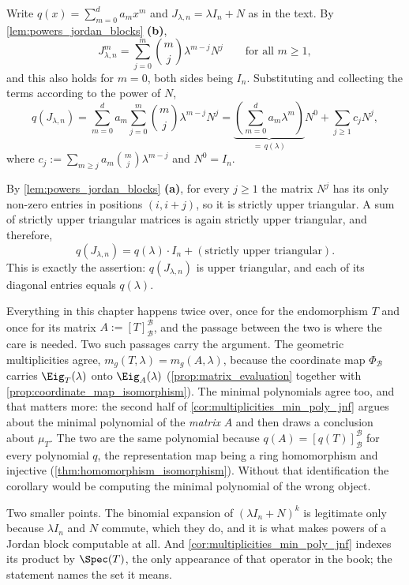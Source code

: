 \begin{exercisesolution}
\label{sol:polynomial_of_jordan_block}
Write $q(x) = \sum_{m=0}^d a_m x^m$ and $J_{\lambda, n} = \lambda I_n + N$ as in the text. By \cref{lem:powers_jordan_blocks} \textbf{(b)},
\[ J_{\lambda,n}^m = \sum_{j=0}^m \binom{m}{j} \lambda^{m-j} N^j \qquad \text{for all } m \ge 1, \]
and this also holds for $m = 0$, both sides being $I_n$. Substituting and collecting the terms according to the power of $N$,
\[
    q(J_{\lambda,n}) = \sum_{m=0}^d a_m \sum_{j=0}^m \binom{m}{j} \lambda^{m-j} N^j = \underbrace{\left(\sum_{m=0}^d a_m \lambda^m\right)}_{= \, q(\lambda)} N^0 + \sum_{j \ge 1} c_j N^j,
\]
where $c_j := \sum_{m \ge j} a_m \binom{m}{j} \lambda^{m-j}$ and $N^0 = I_n$.

By \cref{lem:powers_jordan_blocks} \textbf{(a)}, for every $j \ge 1$ the matrix $N^j$ has its only non-zero entries in positions $(i, i+j)$, so it is strictly upper triangular. A sum of strictly upper triangular matrices is again strictly upper triangular, and therefore,
\[ q(J_{\lambda,n}) = q(\lambda) \cdot I_n + (\text{strictly upper triangular}). \]
This is exactly the assertion: $q(J_{\lambda,n})$ is upper triangular, and each of its diagonal entries equals $q(\lambda)$.
\end{exercisesolution}

\begin{ainote}
Everything in this chapter happens twice over, once for the endomorphism $T$ and
once for its matrix $A := [T]_{\mathcal{B}}^{\mathcal{B}}$, and the passage
between the two is where the care is needed. Two such passages carry the
argument. The geometric multiplicities agree,
$m_g(T, \lambda) = m_g(A, \lambda)$, because the coordinate map
$\Phi_{\mathcal{B}}$ carries $\Eig_T(\lambda)$ onto $\Eig_A(\lambda)$
(\cref{prop:matrix_evaluation} together with
\cref{prop:coordinate_map_isomorphism}). The minimal polynomials agree too, and
that matters more: the second half of \cref{cor:multiplicities_min_poly_jnf}
argues about the minimal polynomial of the \emph{matrix} $A$ and then draws a
conclusion about $\mu_T$. The two are the same polynomial because
$q(A) = [q(T)]_{\mathcal{B}}^{\mathcal{B}}$ for every polynomial $q$, the
representation map being a ring homomorphism and injective
(\cref{thm:homomorphism_isomorphism}). Without that identification the corollary
would be computing the minimal polynomial of the wrong object.

Two smaller points. The binomial expansion of $(\lambda I_n + N)^k$ is
legitimate only because $\lambda I_n$ and $N$ commute, which they do, and it is
what makes powers of a Jordan block computable at all. And
\cref{cor:multiplicities_min_poly_jnf} indexes its product by $\Spec(T)$, the
only appearance of that operator in the book; the statement names the set it
means.
\end{ainote}


